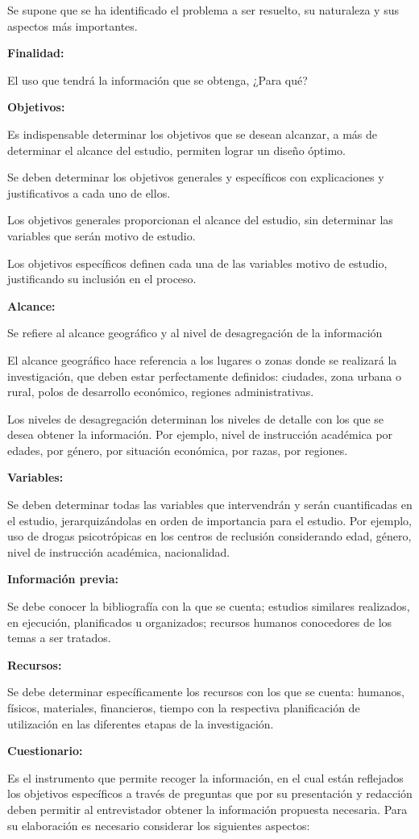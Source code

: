 \documentclass[a5paper,doc,10pt,noapacite]{apa6}
\newcommand{\neodefi}[1]{%
	\vspace{1\baselineskip}
	\textbf{\small#1} \newline
}
\begin{document}
{{Se supone que se ha identificado el problema a ser resuelto, su naturaleza y sus aspectos más importantes.

\neodefi{Finalidad:}

El uso que tendrá la información que se obtenga, ¿Para qué?
	
\neodefi{Objetivos:}
	Es indispensable determinar los objetivos que se desean alcanzar, a más de determinar el alcance del estudio, permiten lograr un diseño óptimo.
	
	Se deben determinar los objetivos generales y específicos con explicaciones y justificativos a cada uno de ellos.
	
	Los objetivos generales proporcionan el alcance del estudio, sin determinar las variables que serán motivo de estudio.
	
	Los objetivos específicos definen cada una de las variables motivo de estudio, justificando su inclusión en el proceso.
	
\neodefi{Alcance:}
	Se refiere al alcance geográfico y al nivel de desagregación de la información
	
	El alcance geográfico hace referencia a los lugares o zonas donde se realizará la investigación, que deben estar perfectamente definidos: ciudades, zona urbana o rural, polos de desarrollo económico, regiones administrativas.
	
	Los niveles de desagregación determinan los niveles de detalle con los que se desea obtener la información. Por ejemplo, nivel de instrucción académica por edades, por género, por situación económica, por razas, por regiones.

\neodefi{Variables:}
	Se deben determinar todas las variables que intervendrán y serán cuantificadas en el estudio, jerarquizándolas en orden de importancia para el estudio. Por ejemplo, uso de drogas psicotrópicas en los centros de reclusión considerando edad, género, nivel de instrucción académica, nacionalidad.

\neodefi{Información previa:}
	Se debe conocer la bibliografía con la que se cuenta; estudios similares realizados, en ejecución, planificados u organizados; recursos humanos conocedores de los temas a ser tratados.

\neodefi{Recursos:}
	Se debe determinar específicamente los recursos con los que se cuenta: humanos, físicos, materiales, financieros, tiempo con la respectiva planificación de utilización en las diferentes etapas de la investigación.
	
\neodefi{Cuestionario:}
	Es el instrumento que permite recoger la información, en el cual están reflejados los objetivos específicos a través de preguntas que por su presentación y redacción deben permitir al entrevistador obtener la información propuesta necesaria. Para su elaboración es necesario considerar los siguientes aspectos:
	
}}
\end{document}
